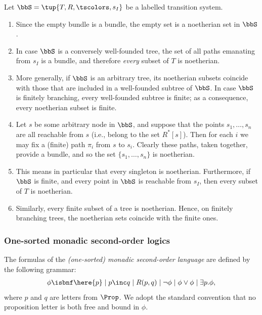 \begin{example} 
\label{ex:noeth}
Let $\bbS = \tup{T,R,\tscolors, s_I}$ be a labelled transition system.
\begin{enumerate} 
\item
Since the empty bundle is a bundle, the empty set is a noetherian set in $\bbS$.
\item
In case $\bbS$ is a conversely well-founded tree, the set of all paths emanating
from $s_{I}$ is a bundle, and therefore \emph{every} subset of $T$ is 
noetherian.
\item
More generally, if $\bbS$ is an arbitrary tree, its noetherian subsets coincide
with those that are included in a well-founded subtree of $\bbS$.
In case $\bbS$ is finitely branching, every well-founded subtree is finite; as a  
consequence, every noetherian subset is finite.
\item
Let $s$ be some arbitrary node in $\bbS$, and suppose that the points $s_{1},
\ldots,s_{n}$ are all reachable from $s$ (i.e., belong to the set 
$R^{*}[s]$).
Then for each $i$ we may fix a (finite) path $\pi_{i}$ from $s$ to $s_{i}$.
Clearly these paths, taken together, provide a bundle, and so the set $\{ s_{1},
\ldots,s_{n} \}$ is noetherian.
\item
This means in particular that every singleton is noetherian.
Furthermore, if $\bbS$ is finite, and every point in $\bbS$ is reachable from 
$s_{I}$, then every subset of $T$ is noetherian.
\item
\label{ex-it:n}
Similarly, every finite subset of a tree is noetherian.
Hence, on finitely branching trees, the noetherian sets coincide with the finite
ones.
\end{enumerate}
\end{example}

\subsubsection*{One-sorted monadic second-order logics}
%
\begin{definition}\label{def:mso}
The formulas of the \emph{(one-sorted) monadic second-order language} are
defined by the following grammar:
%
\begin{eqnarray*}\label{EQ_mso}
  \phi \isbnf  \here{p} \mid p \inc q \mid R(p,q) \mid \lnot\phi 
     \mid \phi\lor\phi \mid \exists p.\phi,
\end{eqnarray*}
where $p$ and $q$ are letters from $\Prop$.
We  adopt the standard convention that no proposition letter is both free and
bound in $\phi$.
\end{definition}


